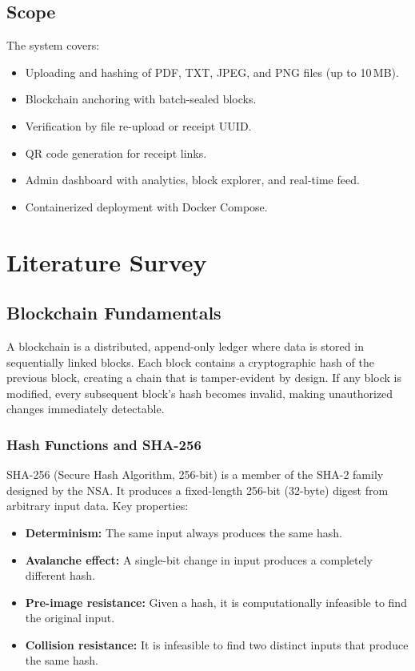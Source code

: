\documentclass[12pt, a4paper]{report}
\begin{document}
\section{Scope}

The system covers:
\begin{itemize}
    \item Uploading and hashing of PDF, TXT, JPEG, and PNG files (up to 10\,MB).
    \item Blockchain anchoring with batch-sealed blocks.
    \item Verification by file re-upload or receipt UUID.
    \item QR code generation for receipt links.
    \item Admin dashboard with analytics, block explorer, and real-time feed.
    \item Containerized deployment with Docker Compose.
\end{itemize}


\chapter{Literature Survey}

\section{Blockchain Fundamentals}

A blockchain is a distributed, append-only ledger where data is stored in
sequentially linked blocks. Each block contains a cryptographic hash of the
previous block, creating a chain that is tamper-evident by design. If any block
is modified, every subsequent block's hash becomes invalid, making unauthorized
changes immediately detectable.

\subsection{Hash Functions and SHA-256}

SHA-256 (Secure Hash Algorithm, 256-bit) is a member of the SHA-2 family
designed by the NSA. It produces a fixed-length 256-bit (32-byte) digest from
arbitrary input data. Key properties:

\begin{itemize}
    \item \textbf{Determinism:} The same input always produces the same hash.
    \item \textbf{Avalanche effect:} A single-bit change in input produces a
          completely different hash.
    \item \textbf{Pre-image resistance:} Given a hash, it is computationally
          infeasible to find the original input.
    \item \textbf{Collision resistance:} It is infeasible to find two distinct
          inputs that produce the same hash.
\end{itemize}
\end{document}
